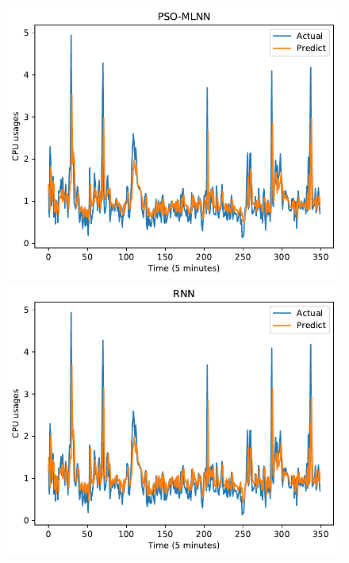 \documentclass[11pt,twoside]{article}
\begin{document}
\begin{multicols}{2}
\begin{figure}[!ht] 
  \begin{minipage}[b]{0.33\linewidth}
    \centering
    \includegraphics[width=0.9\linewidth]{predict/k2/cpu_k2_pso_mlnn.pdf} 
  \end{minipage}
  \begin{minipage}[b]{0.33\linewidth}
    \centering
    \includegraphics[width=0.9\linewidth]{predict/k2/cpu_k2_rnn.pdf} 
  \end{minipage} 
  \begin{minipage}[b]{0.33\linewidth}
    \centering

\end{minipage}
\end{figure}
\end{multicols}
\end{document}
